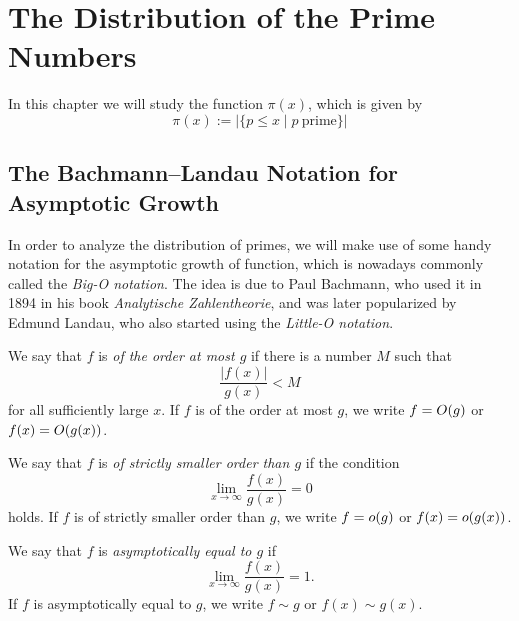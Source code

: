 \chapter{The Distribution of the Prime Numbers}

In this chapter we will study the function $\pi(x)$, which is given by
\begin{equation*}
  \pi(x):=|\{p\leq x\mid p~\mathrm{prime}\}|
\end{equation*}

\section{The Bachmann--Landau Notation for Asymptotic Growth}

In order to analyze the distribution of primes, we will make use of some handy notation for the asymptotic growth of function, which is nowadays commonly called the \emph{Big-O notation}. The idea is due to Paul Bachmann, who used it in 1894 in his book \emph{Analytische Zahlentheorie}, and was later popularized by Edmund Landau, who also started using the \emph{Little-O notation}.

\begin{definition}
  We say that $f$ is \emph{of the order at most $g$} if there is a number $M$ such that
  \begin{equation*}
    \frac{|f(x)|}{g(x)}<M
  \end{equation*}
  for all sufficiently large $x$. If $f$ is of the order at most $g$, we write $f=O(g)$ or $f(x)=O(g(x))$.
\end{definition}

\begin{definition}
  We say that $f$ is \emph{of strictly smaller order than $g$} if the condition
  \begin{equation*}
    \lim_{x\to\infty}\frac{f(x)}{g(x)} = 0
  \end{equation*}
  holds. If $f$ is of strictly smaller order than $g$, we write $f=o(g)$ or $f(x)=o(g(x))$.
\end{definition}

\begin{definition}
  We say that $f$ is \emph{asymptotically equal to $g$} if
  \begin{equation*}
    \lim_{x\to\infty}\frac{f(x)}{g(x)} = 1.
  \end{equation*}
  If $f$ is asymptotically equal to $g$, we write $f\sim g$ or $f(x)\sim g(x)$.
\end{definition}

